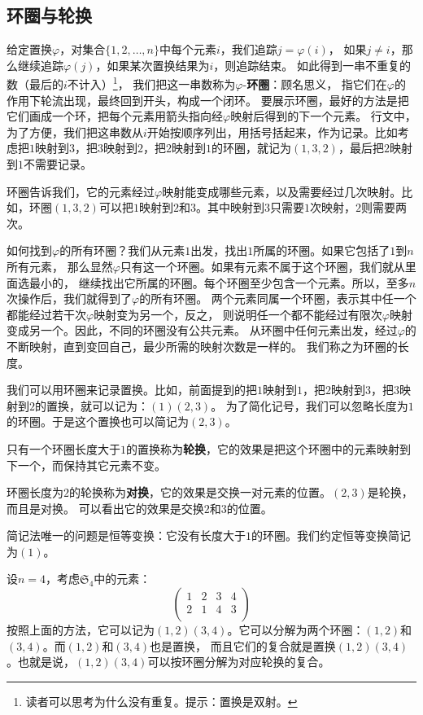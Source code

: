 \documentclass[12pt,UTF8,fontset=none]{ctexbook}
\begin{document}
\subsection{环圈与轮换}
给定置换$\varphi$，对集合$\{1,2,\ldots, n\}$中每个元素$i$，我们追踪$j = \varphi(i)$，
如果$j\neq i$，那么继续追踪$\varphi(j)$，如果某次置换结果为$i$，则追踪结束。
如此得到一串不重复的数（最后的$i$不计入）\footnote{读者可以思考为什么没有重复。提示：置换是双射。}，
我们把这一串数称为$\varphi$-\textbf{环圈}：顾名思义，
指它们在$\varphi$的作用下轮流出现，最终回到开头，构成一个闭环。
要展示环圈，最好的方法是把它们画成一个环，把每个元素用箭头指向经$\varphi$映射后得到的下一个元素。
行文中，为了方便，我们把这串数从$i$开始按顺序列出，用括号括起来，作为记录。比如考虑把$1$映射到$3$，把$3$映射到$2$，把$2$映射到$1$的环圈，就记为$(1,3,2)$，最后把$2$映射到$1$不需要记录。

环圈告诉我们，它的元素经过$\varphi$映射能变成哪些元素，以及需要经过几次映射。比如，环圈$(1,3,2)$可以把$1$映射到$2$和$3$。其中映射到$3$只需要$1$次映射，$2$则需要两次。

如何找到$\varphi$的所有环圈？我们从元素$1$出发，找出$1$所属的环圈。如果它包括了$1$到$n$所有元素，
那么显然$\varphi$只有这一个环圈。如果有元素不属于这个环圈，我们就从里面选最小的，
继续找出它所属的环圈。每个环圈至少包含一个元素。所以，至多$n$次操作后，我们就得到了$\varphi$的所有环圈。
两个元素同属一个环圈，表示其中任一个都能经过若干次$\varphi$映射变为另一个，反之，
则说明任一个都不能经过有限次$\varphi$映射变成另一个。因此，不同的环圈没有公共元素。
从环圈中任何元素出发，经过$\varphi$的不断映射，直到变回自己，最少所需的映射次数是一样的。
我们称之为环圈的长度。

我们可以用环圈来记录置换。比如，前面提到的把$1$映射到$1$，把$2$映射到$3$，把$3$映射到$2$的置换，就可以记为：$(1)(2, 3)$。
为了简化记号，我们可以忽略长度为$1$的环圈。于是这个置换也可以简记为$(2, 3)$。

只有一个环圈长度大于$1$的置换称为\textbf{轮换}，它的效果是把这个环圈中的元素映射到下一个，而保持其它元素不变。

环圈长度为$2$的轮换称为\textbf{对换}，它的效果是交换一对元素的位置。$(2, 3)$是轮换，而且是对换。
可以看出它的效果是交换$2$和$3$的位置。

简记法唯一的问题是恒等变换：它没有长度大于$1$的环圈。我们约定恒等变换简记为$(1)$。

设$n=4$，考虑$\mathfrak{S}_4$中的元素：
$$ \begin{pmatrix}
    1 & 2 & 3 & 4 \\ 2 & 1 & 4 & 3\\
\end{pmatrix} $$
按照上面的方法，它可以记为$(1, 2)(3, 4)$。它可以分解为两个环圈：$(1, 2)$和$(3, 4)$。而$(1, 2)$和$(3, 4)$也是置换，
而且它们的复合就是置换$(1, 2)(3, 4)$。也就是说，$(1, 2)(3, 4)$可以按环圈分解为对应轮换的复合。
\end{document}
